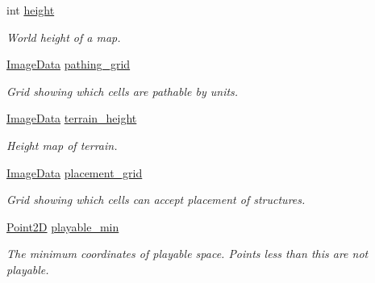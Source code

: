 \begin{DoxyCompactItemize}
int \hyperlink{structsc2_1_1_game_info_a81e1a29b3074946432fff0d11ca6731f}{height}
\begin{DoxyCompactList}\small\item\em World height of a map. \end{DoxyCompactList}\item 
\mbox{\label{structsc2_1_1_game_info_a4eca87fbfd989b2a3c8ea3346d2c3677}} 
\hyperlink{structsc2_1_1_image_data}{Image\+Data} \hyperlink{structsc2_1_1_game_info_a4eca87fbfd989b2a3c8ea3346d2c3677}{pathing\+\_\+grid}
\begin{DoxyCompactList}\small\item\em Grid showing which cells are pathable by units. \end{DoxyCompactList}\item 
\mbox{\label{structsc2_1_1_game_info_af0b251e21f771f06ca1927c9dff2e43b}} 
\hyperlink{structsc2_1_1_image_data}{Image\+Data} \hyperlink{structsc2_1_1_game_info_af0b251e21f771f06ca1927c9dff2e43b}{terrain\+\_\+height}
\begin{DoxyCompactList}\small\item\em Height map of terrain. \end{DoxyCompactList}\item 
\mbox{\label{structsc2_1_1_game_info_a97b2e1a0e7b22105d52dd7761b16111f}} 
\hyperlink{structsc2_1_1_image_data}{Image\+Data} \hyperlink{structsc2_1_1_game_info_a97b2e1a0e7b22105d52dd7761b16111f}{placement\+\_\+grid}
\begin{DoxyCompactList}\small\item\em Grid showing which cells can accept placement of structures. \end{DoxyCompactList}\item 
\mbox{\label{structsc2_1_1_game_info_acf482bed6694db9ce4b7da0e139eac57}} 
\hyperlink{structsc2_1_1_point2_d}{Point2D} \hyperlink{structsc2_1_1_game_info_acf482bed6694db9ce4b7da0e139eac57}{playable\+\_\+min}
\begin{DoxyCompactList}\small\item\em The minimum coordinates of playable space. Points less than this are not playable. \end{DoxyCompactList}\item 
\mbox{\label{structsc2_1_1_game_info_a5b6d4abc12023b79a197ca3071ee79c8}} 

\end{DoxyCompactItemize}
